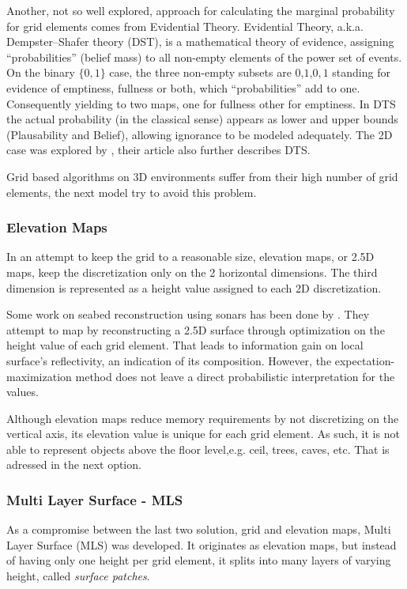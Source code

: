 Another, not so well explored, approach for calculating the marginal probability
for grid elements comes from Evidential Theory. Evidential Theory, a.k.a.
Dempster–Shafer theory (DST), is a mathematical theory of evidence, assigning
``probabilities'' (belief mass) to all non-empty elements of the power set of
events. On the binary $\{0,1\}$ case, the three non-empty subsets are
${0}$,${1}$,${0,1}$ standing for evidence of emptiness, fullness or both, which
``probabilities'' add to one.
Consequently yielding to two maps, one for fullness other for emptiness. In DTS
the actual probability (in the classical sense) appears as lower and upper
bounds (Plausability and Belief), allowing ignorance to be modeled adequately.
The 2D case was explored by \citet{Pagac1998}, their article also further
describes DTS.

Grid based algorithms on 3D environments suffer from their high number of grid
elements, the next model try to avoid this problem.

\subsubsection{Elevation Maps}

In an attempt to keep the grid to a reasonable size, elevation maps, or 2.5D
maps, keep the discretization only on the 2 horizontal dimensions. The third
dimension is represented as a height value assigned to each 2D discretization.

Some work on seabed reconstruction using sonars has been done by
\citet{Coiras2007,Coiras2009}. They attempt to map by reconstructing a
2.5D surface through optimization on the height value of each grid element. That
leads to information gain on local surface's reflectivity, an indication of its
composition. However, the expectation-maximization method does not leave a
direct probabilistic interpretation for the values.

Although elevation maps reduce memory requirements by not discretizing on
the vertical axis, its elevation value is unique for each grid element. As such,
it is not able to represent objects above the floor level,e.g. ceil, trees,
caves, etc. That is adressed in the next option.

\subsubsection{Multi Layer Surface - MLS}

As a compromise between the last two solution, grid and elevation maps, Multi
Layer Surface (MLS) was developed. It originates as elevation maps, but instead
of having only one height per grid element, it splits into many layers of
varying height, called \textit{surface patches}.

